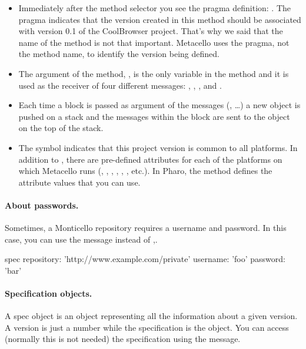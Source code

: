 \documentclass[a4paper,10pt,twoside]{book}
\begin{document}
\begin{itemize}
\item Immediately after the method selector you see the pragma definition:  . The pragma  indicates that the version created in this method should be associated with version 0.1 of the CoolBrowser project. That's why we said that the name of the method is not that important. Metacello uses the pragma, not the method name, to identify the version being defined.

\item The argument of the method, , is the only variable in
the method and it is used as the receiver of four different messages: , ,    , and  .

\item Each time a block is passed as argument of the messages (, \dots) a new object is pushed on a stack and the messages within the block are sent to the object on the top of the stack.

\item The symbol  indicates that this project version is common to all platforms.  In addition to , there are pre-defined attributes for each of the platforms on which Metacello runs (, , , , , , etc.). In Pharo, the method  defines the attribute values that you can use. 
\end{itemize}

\paragraph{About passwords.} Sometimes, a Monticello repository requires a username and password. In this case,  you can use the message  instead of ,.

\begin{code}{}
         spec repository: 'http://www.example.com/private' username: 'foo' password: 'bar' 
\end{code}


\paragraph{Specification objects.}
A spec object is an object representing all the information about a given version. A version is just a number 
while the specification is the object. You can access (normally this is not needed) the specification using the  message. 
\end{document}
